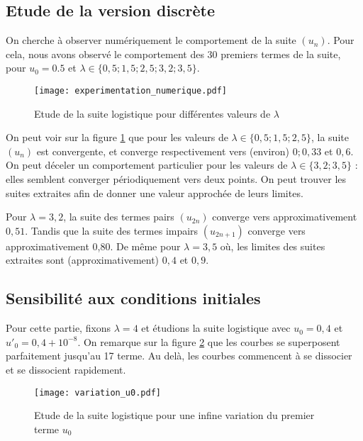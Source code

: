 \subsection{Etude de la version discrète}
On cherche à observer numériquement le comportement de la suite $(u_n)$. Pour cela, nous avons observé le comportement des $30$ premiers termes de la suite, pour $u_0 = 0.5$ et $\lambda\in\{0,5; 1,5; 2,5; 3,2; 3,5\}$.

\begin{figure}[!h]
    \begin{center}
        \texttt{[image: experimentation\_numerique.pdf]}
    \end{center}
    \caption{Etude de la suite logistique pour différentes valeurs de $\lambda$}
    \label{fig:etude_lambdas}
\end{figure}
On peut voir sur la figure \ref{fig:etude_lambdas} que pour les valeurs de $\lambda\in\{0,5; 1,5; 2,5\}$, la suite $(u_n)$ est convergente, et converge respectivement vers (environ) $0; 0,33$ et $0,6$. On peut déceler un comportement particulier pour les valeurs de $\lambda \in\{3,2; 3,5\}$ : elles semblent converger périodiquement vers deux points. On peut trouver les suites extraites afin de donner une valeur approchée de leurs limites.

Pour $\lambda = 3,2$, la suite des termes pairs $(u_{2n})$ converge vers approximativement $0,51$. Tandis que la suite des termes impairs $(u_{2n+1})$ converge vers approximativement 0,80. De même pour $\lambda = 3,5$ où, les limites des suites extraites sont (approximativement) $0,4$ et $0,9$.

\subsection{Sensibilité aux conditions initiales}
Pour cette partie, fixons $\lambda = 4$ et étudions la suite logistique avec $u_0 = 0,4$ et $u'_0 = 0,4 + 10^{-8}$. On remarque sur la figure \ref{fig:etude_u0} que les courbes se superposent parfaitement jusqu'au 17\ieme{} terme. Au delà, les courbes commencent à se dissocier et se dissocient rapidement.

\begin{figure}[!h]
    \begin{center}
        \texttt{[image: variation\_u0.pdf]}
    \end{center}
    \caption{Etude de la suite logistique pour une infine variation du premier terme $u_0$}
    \label{fig:etude_u0}
\end{figure}

